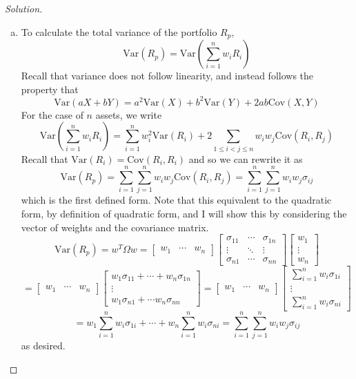 \documentclass[12pt]{scrartcl}
\newcommand{\V}{\text{Var}}
\newcommand{\Cov}{\text{Cov}}
\begin{document}
\begin{proof}[Solution]

\hfill

\begin{enumerate}[a.]

\item To calculate the total variance of the portfolio $R_p$, 
\[\V(R_p) = \V(\sum_{i=1}^n w_i R_i)\]
Recall that variance does not follow linearity, and instead follows the property that 
\[\V(aX + bY) = a^2\V(X) + b^2\V(Y) + 2ab\Cov(X, Y)\]
For the case of $n$ assets, we write 
\[\V(\sum_{i=1}^n w_i R_i) = \sum_{i=1}^n w_i^2 \V(R_i) + 2\sum_{1 \leq i < j \leq n} w_i w_j\Cov(R_i, R_j)\]
Recall that $\V(R_i) = \Cov(R_i, R_i)$ and so we can rewrite it as
\[\V(R_p) = \sum_{i=1}^n \sum_{j=1}^n w_i w_j \Cov(R_i, R_j) = \sum_{i=1}^n \sum_{j=1}^n w_i w_j \sigma_{ij}\]
which is the first defined form. Note that this equivalent to the quadratic form, by definition of quadratic form,
and I will show this by considering the vector of weights and the covariance matrix.
\[\V(R_p) = w^T \Omega w = \begin{bmatrix}
  w_1 & \cdots & w_n
\end{bmatrix} \begin{bmatrix}
  \sigma_{11} & \cdots & \sigma_{1n}\\
  \vdots & \ddots & \vdots \\
  \sigma_{n1} & \cdots & \sigma_{nn}
\end{bmatrix} \begin{bmatrix}
  w_1 \\ \vdots \\ w_n
\end{bmatrix}\]
\[ = \begin{bmatrix}
  w_1 & \cdots & w_n
\end{bmatrix} \begin{bmatrix}
  w_1\sigma_{11} + \cdots + w_n\sigma_{1n}\\
  \vdots \\ 
  w_1\sigma_{n1} + \cdots w_n\sigma_{nn}
\end{bmatrix} = \begin{bmatrix}
  w_1 & \cdots & w_n
\end{bmatrix}
  \begin{bmatrix}
  \sum_{i=1}^n w_i \sigma_{1i}\\
  \vdots \\
  \sum_{i=1}^n w_i \sigma_{ni}
\end{bmatrix}\]
\[= w_1\sum_{i=1}^n w_i\sigma_{1i} + \cdots + w_n\sum_{i=1}^n w_i\sigma_{ni} = \sum_{i=1}^n \sum_{j=1}^n w_i w_j \sigma_{ij}\]
as desired.


\end{enumerate}
\end{proof}
\end{document}
